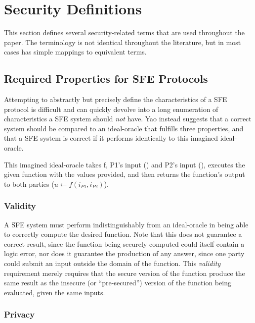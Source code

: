 \section{Security Definitions}
\label{sec:definitions}

This section defines several security-related terms that are used throughout the paper.  The terminology is not identical throughout the literature, but in most cases has simple mappings to equivalent terms.


\subsection{Required Properties for \ac{SFE} Protocols}

Attempting to abstractly but precisely define the characteristics of a \ac{SFE} protocol is difficult and can quickly devolve into a long enumeration of characteristics a \ac{SFE} system should \emph{not} have.  Yao instead suggests\cite{yao1986generate} that a correct system should be compared to an ideal-oracle that fulfills three properties, and that a \ac{SFE} system is correct if it performs identically to this imagined ideal-oracle.

This imagined ideal-oracle takes \ac{f}, \ac{P1}'s input (\ponein) and \ac{P2}'s input (\ptwoin), executes the given function with the values provided, and then returns the function's output to both parties ($u \leftarrow f(i_{P1}, i_{P2})$).


\subsubsection{Validity}

A \ac{SFE} system must perform indistinguishably from an ideal-oracle in being able to correctly compute the desired function. Note that this does not guarantee a correct result, since the function being securely computed could itself contain a logic error, nor does it guarantee the production of any answer, since one party could submit an input outside the domain of the function. This \emph{validity} requirement merely requires that the secure version of the function produce the same result as the insecure (or ``pre-secured'') version of the function being evaluated, given the same inputs.


\subsubsection{Privacy}

